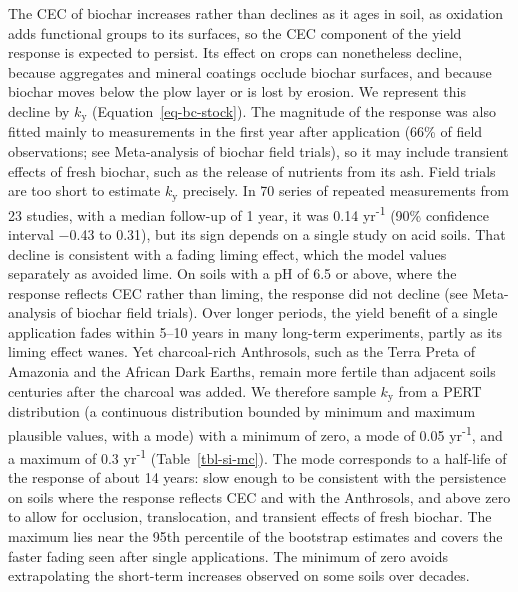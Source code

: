 \documentclass[
  letterpaper,
  twoside,
  twocolumn,
  9pt]{article}
\begin{document}
The CEC of biochar increases rather than declines as it ages in soil, as
oxidation adds functional groups to its
surfaces,\citep{cheng2006, liang2006} so the CEC component of the yield
response is expected to persist. Its effect on crops can nonetheless
decline, because aggregates and mineral coatings occlude biochar
surfaces,\citep{brodowski2006} and because biochar moves below the plow
layer or is lost by erosion.\citep{major2010, rumpel2006} We represent
this decline by \(k_{\mathrm{y}}\) (Equation~\ref{eq-bc-stock}). The
magnitude of the response was also fitted mainly to measurements in the
first year after application (66\% of field observations; see
Meta-analysis of biochar field trials), so it may include transient
effects of fresh biochar, such as the release of nutrients from its ash.
Field trials are too short to estimate \(k_{\mathrm{y}}\) precisely. In
70 series of repeated measurements from 23 studies, with a median
follow-up of 1 year, it was 0.14 yr\textsuperscript{-1} (90\% confidence
interval −0.43 to 0.31), but its sign depends on a single study on acid
soils.\citep{cornelissen2013} That decline is consistent with a fading
liming effect, which the model values separately as avoided lime. On
soils with a pH of 6.5 or above, where the response reflects CEC rather
than liming, the response did not decline (see Meta-analysis of biochar
field trials). Over longer periods, the yield benefit of a single
application fades within 5--10 years in many long-term experiments,
partly as its liming effect wanes.\citep{yang2025biochar} Yet
charcoal-rich Anthrosols, such as the Terra Preta of Amazonia and the
African Dark Earths, remain more fertile than adjacent soils centuries
after the charcoal was added.\citep{glaser2001, liang2006, solomon2016}
We therefore sample \(k_{\mathrm{y}}\) from a PERT distribution (a
continuous distribution bounded by minimum and maximum plausible values,
with a mode) with a minimum of zero, a mode of 0.05
yr\textsuperscript{-1}, and a maximum of 0.3 yr\textsuperscript{-1}
(Table~\ref{tbl-si-mc}). The mode corresponds to a half-life of the
response of about 14 years: slow enough to be consistent with the
persistence on soils where the response reflects CEC and with the
Anthrosols, and above zero to allow for occlusion, translocation, and
transient effects of fresh biochar. The maximum lies near the 95th
percentile of the bootstrap estimates and covers the faster fading seen
after single applications. The minimum of zero avoids extrapolating the
short-term increases observed on some soils over decades.
\end{document}
